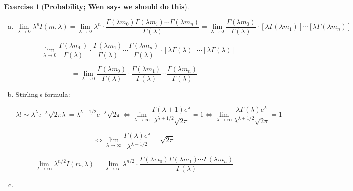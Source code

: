 \documentclass{article}
\theoremstyle{definition}
\newtheorem{exercise}{Exercise}
\newtheorem{definition}{Definition}
\theoremstyle{definition}
\theoremstyle{definition}
\theoremstyle{definition}
\begin{document}
\begin{exercise}[\textbf{Probability; Wen says we should do this}]
\begin{enumerate}[(a)]
\[
= \frac{\Gamma(\lambda m_0) \Gamma(\lambda m_1)}{\Gamma(\lambda)}
\]

where we used the definition of the Beta function:

\[
B(z_1, z_2) := \int_0^1 t^{z_1 - 1} (1-t)^{z_2 - 1} \ dt= \frac{ \Gamma(z_1) \Gamma(z_2)}{\Gamma(z_1 + z_2)}
\]

\item

\[
\lim_{\lambda \to 0} \lambda^n I(m, \lambda) = \lim_{\lambda \to 0} \lambda^n \cdot   \frac{\Gamma(\lambda m_0) \Gamma(\lambda m_1) \cdots \Gamma(\lambda m_n)}{\Gamma(\lambda)} = \lim_{\lambda \to 0}  \frac{ \Gamma(\lambda m_0) }{\Gamma(\lambda)} \cdot  [\lambda  \Gamma(\lambda m_1)] \cdots[ \lambda \Gamma(\lambda m_n)]
\]

\[
= \lim_{\lambda \to 0}  \frac{ \Gamma(\lambda m_0) }{\Gamma(\lambda)}\cdot \frac{\Gamma(\lambda m_1)}{\Gamma(\lambda)} \cdots \frac{\Gamma(\lambda m_n)}{\Gamma(\lambda)}  \cdot  [\lambda  \Gamma(\lambda )] \cdots[ \lambda \Gamma(\lambda )]
\]

\[
= \lim_{\lambda \to 0}  \frac{ \Gamma(\lambda m_0) }{\Gamma(\lambda)}\cdot \frac{\Gamma(\lambda m_1)}{\Gamma(\lambda)} \cdots \frac{\Gamma(\lambda m_n)}{\Gamma(\lambda)}  
\]

\item Stirling's formula: 

\[
\lambda! \sim \lambda^\lambda e^{-\lambda} \sqrt{2\pi \lambda} = \lambda^{\lambda + 1/2} e^{-\lambda} \sqrt{2\pi } \iff \lim_{\lambda \to \infty} \frac{ \Gamma(\lambda+1) e^\lambda}{\lambda^{\lambda + 1/2}  \sqrt{2\pi }} = 1 \iff \lim_{\lambda \to \infty} \frac{\lambda \Gamma(\lambda) e^\lambda}{\lambda^{\lambda + 1/2}  \sqrt{2\pi }} = 1
\]

\[
 \iff \lim_{\lambda \to \infty} \frac{ \Gamma(\lambda) e^\lambda}{\lambda^{\lambda - 1/2}  } = \sqrt{2\pi }
\]


\[
\lim_{\lambda \to \infty} \lambda^{n/2} I(m, \lambda) = \lim_{\lambda \to \infty} \lambda^{n/2} \cdot \frac{\Gamma(\lambda m_0) \Gamma(\lambda m_1) \cdots \Gamma(\lambda m_n)}{\Gamma(\lambda)} 
\]

\item

\

\begin{center}
\noindent{}
\end{center}
\end{enumerate}
\end{exercise}
\end{document}
